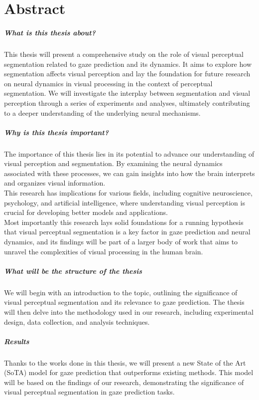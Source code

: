 \chapter*{Abstract}

\paragraph{What is this thesis about?}
This thesis will present a comprehensive study on the role of visual perceptual segmentation related to gaze prediction and its dynamics. It aims to explore how segmentation affects visual perception and lay the foundation for future research on neural dynamics in visual processing in the context of perceptual segmentation.
We will investigate the interplay between segmentation and visual perception through a series of experiments and analyses, ultimately contributing to a deeper understanding of the underlying neural mechanisms.

\paragraph{Why is this thesis important?}

The importance of this thesis lies in its potential to advance our understanding of visual perception and segmentation. By examining the neural dynamics associated with these processes, we can gain insights into how the brain interprets and organizes visual information.\\
This research has implications for various fields, including cognitive neuroscience, psychology, and artificial intelligence, where understanding visual perception is crucial for developing better models and applications.\\
Most importantly this research lays solid foundations for a running hypothesis that visual perceptual segmentation is a key factor in gaze prediction and neural dynamics, and its findings will be part of a larger body of work that aims to unravel the complexities of visual processing in the human brain.

\paragraph{What will be the structure of the thesis}
We will begin with an introduction to the topic, outlining the significance of visual perceptual segmentation and its relevance to gaze prediction. The thesis will then delve into the methodology used in our research, including experimental design, data collection, and analysis techniques.\\

\paragraph{Results}

Thanks to the works done in this thesis, we will present a new State of the Art (SoTA) model for gaze prediction that outperforms existing methods. This model will be based on the findings of our research, demonstrating the significance of visual perceptual segmentation in gaze prediction tasks.\\

\thispagestyle{empty}
\mbox{}
\newpage
